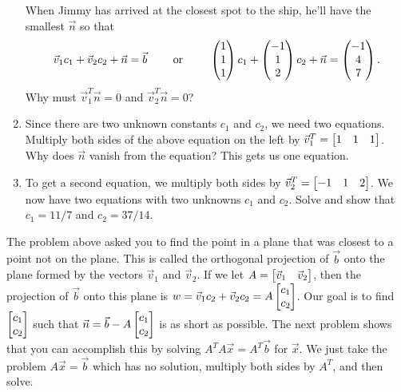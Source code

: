 \begin{problem}
\begin{enumerate}
\begin{center}
\begin{tikzpicture}[scale=1]
\end{tikzpicture}
\end{center}
 When Jimmy has arrived at the closest spot to the ship, he'll have the smallest $\vec n$ so that 
$$\vec v_1 c_1+\vec v_2 c_2+\vec n=\vec b\quad\quad\text{ or }
\quad \quad 
\pvec{1\\1\\1} c_1+\pvec{-1\\1\\2} c_2+\vec n=\pvec{-1\\4\\7}.$$ Why must $\vec v_1^T\vec n=0$ and $\vec v_2^T\vec n=0$?  
 \item 
 Since there are two unknown constants $c_1$ and $c_2$, we need two equations.  Multiply both sides of the above equation on the left by $\vec v_1^T=\bvec{1&1&1}$. Why does $\vec n$ vanish from the equation? This gets us one equation.
 \item 
 To get a second equation, we multiply both sides by $\vec v_2^T=\bvec{-1&1&2}$. We now have two equations with two unknowns $c_1$ and $c_2$. Solve and show that $c_1 = 11/7$ and $c_2=37/14$.
\end{enumerate}

\end{problem}

The problem above asked you to find the point in a plane that was closest to a point not on the plane.  This is called the orthogonal projection of $\vec b$ onto the plane formed by the vectors $\vec v_1$ and $\vec v_2$.  If we let $A=\bvec{\vec v_1&\vec v_2}$, then the projection of $\vec b$ onto this plane is $w=\vec v_1c_2+\vec v_2c_2=A\bvec{c_1\\c_2}$. Our goal is to find $\bvec{c_1\\c_2}$ such that $\vec n=\vec b-A\bvec{c_1\\c_2}$ is as short as possible. The next problem shows that you can accomplish this by solving $A^TA\vec x=A^T\vec b$ for $\vec x$. We just take the problem $A\vec x=\vec b$ which has no solution, multiply both sides by $A^T$, and then solve.  




